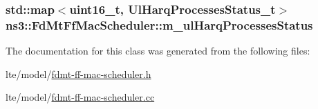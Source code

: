 \subsubsection[{\texorpdfstring{m\+\_\+ul\+Harq\+Processes\+Status}{m_ulHarqProcessesStatus}}]{\setlength{\rightskip}{0pt plus 5cm}std\+::map$<$uint16\+\_\+t, {\bf Ul\+Harq\+Processes\+Status\+\_\+t}$>$ ns3\+::\+Fd\+Mt\+Ff\+Mac\+Scheduler\+::m\+\_\+ul\+Harq\+Processes\+Status\hspace{0.3cm}{\ttfamily [private]}}\hypertarget{classns3_1_1FdMtFfMacScheduler_a22401d77ac7acda9217ac4807fd55fa2}{}\label{classns3_1_1FdMtFfMacScheduler_a22401d77ac7acda9217ac4807fd55fa2}


The documentation for this class was generated from the following files\+:\begin{DoxyCompactItemize}
\item 
lte/model/\hyperlink{fdmt-ff-mac-scheduler_8h}{fdmt-\/ff-\/mac-\/scheduler.\+h}\item 
lte/model/\hyperlink{fdmt-ff-mac-scheduler_8cc}{fdmt-\/ff-\/mac-\/scheduler.\+cc}\end{DoxyCompactItemize}
